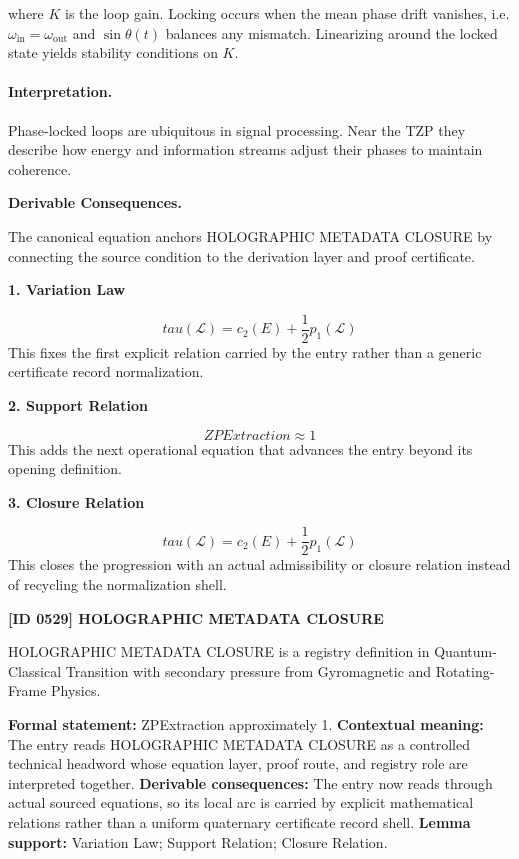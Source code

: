 where $K$ is the loop gain.  Locking occurs when the mean phase drift vanishes, i.e. $\omega_{\mathrm{in}} = \omega_{\mathrm{out}}$ and $\sin\theta(t)$ balances any mismatch.
Linearizing around the locked state yields stability conditions on $K$.

\paragraph{Interpretation.}

Phase‑locked loops are ubiquitous in signal processing.  Near the TZP they describe how energy and information streams adjust their phases to maintain coherence.

\par\vspace{0.35em}
\noindent\textbf{Derivable Consequences.}\quad
\begingroup
\footnotesize
\raggedright
The canonical equation anchors HOLOGRAPHIC METADATA CLOSURE by connecting the source condition to the derivation layer and proof certificate.
\par\endgroup

\noindent\textbf{1. Variation Law}\par
\[
tau(\mathcal{L}) = c_2(E) + \frac{1}{2}p_1(\mathcal{L})
\]
\noindent This fixes the first explicit relation carried by the entry rather than a generic certificate record normalization.\par
\noindent\textbf{2. Support Relation}\par
\[
ZPExtraction \approx 1
\]
\noindent This adds the next operational equation that advances the entry beyond its opening definition.\par
\noindent\textbf{3. Closure Relation}\par
\[
tau(\mathcal{L}) = c_2(E) + \frac{1}{2}p_1(\mathcal{L})
\]
\noindent This closes the progression with an actual admissibility or closure relation instead of recycling the normalization shell.\par

\clearpage
\noindent\textbf{[ID 0529] HOLOGRAPHIC METADATA CLOSURE}\par
\vspace{0.35em}
\begingroup\small
{}
HOLOGRAPHIC METADATA CLOSURE is a registry definition in Quantum-Classical Transition with secondary pressure from Gyromagnetic and Rotating-Frame Physics.

\begingroup\footnotesize\setlength{\emergencystretch}{3em}\sloppy
\textbf{Formal statement:} ZPExtraction approximately 1. \textbf{Contextual meaning:} The entry reads HOLOGRAPHIC METADATA CLOSURE as a controlled technical headword whose equation layer, proof route, and registry role are interpreted together. \textbf{Derivable consequences:} The entry now reads through actual sourced equations, so its local arc is carried by explicit mathematical relations rather than a uniform quaternary certificate record shell. \textbf{Lemma support:} Variation Law; Support Relation; Closure Relation.\par
\endgroup

